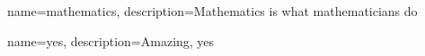 

{
        name=mathematics,
        description={Mathematics is what mathematicians do}
}

{
	name=yes,
	description={Amazing, yes}
}